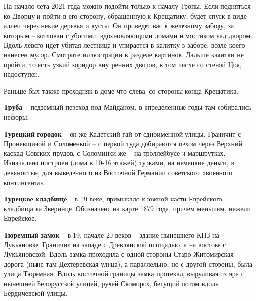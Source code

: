 На начало лета 2021 года можно подойти только к началу Тропы. Если подняться ко Дворцу и пойти в его сторону, обращенную к Крещатику, будет спуск в виде аллеи через некие деревья и кусты. Он приведет вас к железному забору, за которым – котлован с убогими, вдохновляющими домами и мостиком над двором. Вдоль левого идет убитая лестница и упирается в калитку в заборе, возле коего нанесен мусор. Смотрите иллюстрации в разделе картинок. Дальше калитки не пройти, то есть узкий коридор внутренних дворов, в том числе со стеной Цоя, недоступен.

Раньше был также проходняк в доме что слева, со стороны конца Крещатика.\\

\medskip

\textbf{Труба} – подземный переход под Майданом, в определенные годы там собирались нефоры.\\

\medskip


\textbf{Турецкий городок} – он же Кадетский гай от одноименной улицы. Граничит с Проневщиной и Соломенкой – с первой туда добираются пехом через Верхний каскад Совских прудов, с Соломинки же – на троллейбусе и маршрутках. Изначально построен (дома в 10-16 этажей) турками, на немецкие деньги, в девяностые, для выведенного из Восточной Германии советского «военного контингента».\\

\medskip

\textbf{Турецкое кладбище} – в 19 веке, примыкало к южной части Еврейского кладбища на Зверинце. Обозначено на карте 1879 года, причем меньшим, нежели Еврейское.\\

\medskip

\textbf{Тюремный замок} – в 19, начале 20 веков – здание нынешнего КПЗ на Лукьяновке. Граничил на западе с Древлянской площадью, а на востоке с Лукьяновской. Вдоль замка проходила с одной стороны Старо-Житомирская дорога (ныне там Дехтеревская улица), а параллельно, но с другой стороны, была улица Тюремная. Вдоль восточной границы замка протекал, выруливая из яра с нынешней Белорусской улицей, ручей Скоморох, бегущий потом вдоль Бердичевской улицы.
